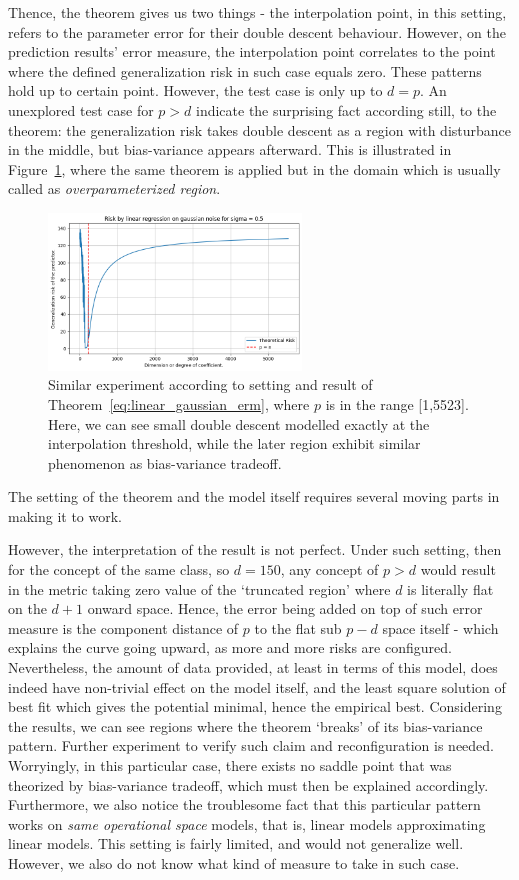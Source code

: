 \documentclass[twoside,10pt]{article}
\begin{document}
Thence, the theorem gives us two things - the interpolation point, in this setting, refers to the parameter error for their double descent behaviour. However, on the prediction results' error measure, the interpolation point correlates to the point where the defined generalization risk in such case equals zero. These patterns hold up to certain point. However, the test case is only up to $d=p$. An unexplored test case for $p>d$ indicate the surprising fact according still, to the theorem: the generalization risk takes double descent as a region with disturbance in the middle, but bias-variance appears afterward. This is illustrated in Figure~\ref{fig:contrarian}, where the same theorem is applied but in the domain which is usually called as \textit{overparameterized region}. 
\begin{figure}[htp]
  \centering
  \includegraphics[width=0.6\textwidth]{img/dimensional_descent.png}
  \caption{Similar experiment according to setting and result of Theorem~\ref{eq:linear_gaussian_erm}, where $p$ is in the range [1,5523]. Here, we can see small double descent modelled exactly at the interpolation threshold, while the later region exhibit similar phenomenon as bias-variance tradeoff.}
  \label{fig:contrarian}
\end{figure}

The setting of the theorem and the model itself requires several moving parts in making it to work. 

However, the interpretation of the result is not perfect. Under such setting, then for the concept of the same class, so $d=150$, any concept of $p>d$ would result in the metric taking zero value of the `truncated region' where $d$ is literally flat on the $d+1$ onward space. Hence, the error being added on top of such error measure is the component distance of $p$ to the flat sub $p-d$ space itself - which explains the curve going upward, as more and more risks are configured. Nevertheless, the amount of data provided, at least in terms of this model, does indeed have non-trivial effect on the model itself, and the least square solution of best fit which gives the potential minimal, hence the empirical best. Considering the results, we can see regions where the theorem `breaks' of its bias-variance pattern. Further experiment to verify such claim and reconfiguration is needed. Worryingly, in this particular case, there exists no saddle point that was theorized by bias-variance tradeoff, which must then be explained accordingly. Furthermore, we also notice the troublesome fact that this particular pattern works on \textit{same operational space} models, that is, linear models approximating linear models. This setting is fairly limited, and would not generalize well. However, we also do not know what kind of measure to take in such case. 
\end{document}
